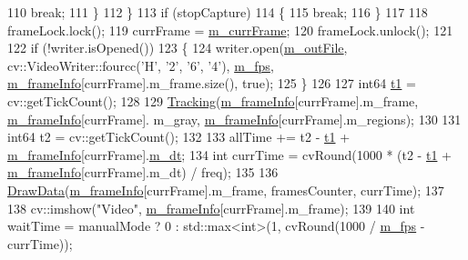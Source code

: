 \begin{DoxyCode}
110                 \textcolor{keywordflow}{break};
111             \}
112         \}
113         \textcolor{keywordflow}{if} (stopCapture)
114         \{
115             \textcolor{keywordflow}{break};
116         \}
117 
118         frameLock.lock();
119         currFrame = \mbox{\hyperlink{class_video_example_a4adccbe4084f68f10d966901b168a98a}{m\_currFrame}};
120         frameLock.unlock();
121 
122         \textcolor{keywordflow}{if} (!writer.isOpened())
123         \{
124             writer.open(\mbox{\hyperlink{class_video_example_a4234fb0df2f009bc3f651f01cbd5bde5}{m\_outFile}}, cv::VideoWriter::fourcc(\textcolor{charliteral}{'H'}, \textcolor{charliteral}{'2'}, \textcolor{charliteral}{'6'}, \textcolor{charliteral}{'4'}), 
      \mbox{\hyperlink{class_video_example_ae8110012f8d57f39d6355377cf20fb27}{m\_fps}}, \mbox{\hyperlink{class_video_example_af5363ad3ed9a34bd105dbdaf274acb66}{m\_frameInfo}}[currFrame].m\_frame.size(), \textcolor{keyword}{true});
125         \}
126 
127         int64 \mbox{\hyperlink{gml2nestedsql_8cpp_a214bd1a0500f5739ce581a8bcffb518a}{t1}} = cv::getTickCount();
128 
129         \mbox{\hyperlink{class_video_example_af412482dcaad532d958dc31b362ee1c2}{Tracking}}(\mbox{\hyperlink{class_video_example_af5363ad3ed9a34bd105dbdaf274acb66}{m\_frameInfo}}[currFrame].m\_frame, \mbox{\hyperlink{class_video_example_af5363ad3ed9a34bd105dbdaf274acb66}{m\_frameInfo}}[currFrame].
      m\_gray, \mbox{\hyperlink{class_video_example_af5363ad3ed9a34bd105dbdaf274acb66}{m\_frameInfo}}[currFrame].m\_regions);
130 
131         int64 t2 = cv::getTickCount();
132 
133         allTime += t2 - \mbox{\hyperlink{gml2nestedsql_8cpp_a214bd1a0500f5739ce581a8bcffb518a}{t1}} + \mbox{\hyperlink{class_video_example_af5363ad3ed9a34bd105dbdaf274acb66}{m\_frameInfo}}[currFrame].\mbox{\hyperlink{struct_video_example_1_1_frame_info_a1f0a32e6ab3a40b1173f73767523372f}{m\_dt}};
134         \textcolor{keywordtype}{int} currTime = cvRound(1000 * (t2 - \mbox{\hyperlink{gml2nestedsql_8cpp_a214bd1a0500f5739ce581a8bcffb518a}{t1}} + \mbox{\hyperlink{class_video_example_af5363ad3ed9a34bd105dbdaf274acb66}{m\_frameInfo}}[currFrame].m\_dt) / freq);
135 
136         \mbox{\hyperlink{class_video_example_a53eb15977cb147dac218d8ea337986cd}{DrawData}}(\mbox{\hyperlink{class_video_example_af5363ad3ed9a34bd105dbdaf274acb66}{m\_frameInfo}}[currFrame].m\_frame, framesCounter, currTime);
137 
138         cv::imshow(\textcolor{stringliteral}{"Video"}, \mbox{\hyperlink{class_video_example_af5363ad3ed9a34bd105dbdaf274acb66}{m\_frameInfo}}[currFrame].m\_frame);
139 
140         \textcolor{keywordtype}{int} waitTime = manualMode ? 0 : std::max<int>(1, cvRound(1000 / \mbox{\hyperlink{class_video_example_ae8110012f8d57f39d6355377cf20fb27}{m\_fps}} - currTime));

\end{DoxyCode}
